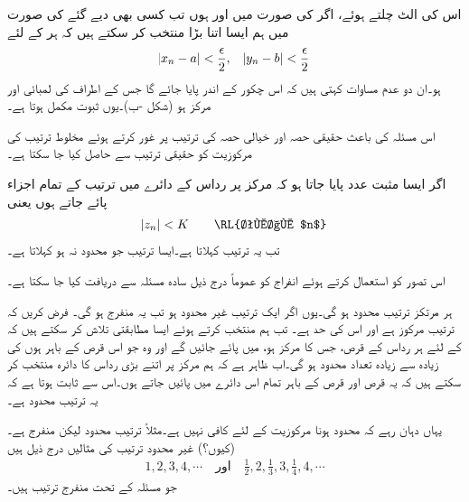 اس کی الٹ چلتے ہوئے، اگر  کی صورت میں  اور  ہوں  تب کسی بھی دیے گئے  کی صورت میں ہم ایسا  اتنا بڑا منتخب کر سکتے ہیں کہ ہر  کے لئے 
\begin{align*}
\abs{x_n-a}<\frac{\epsilon}{2},\quad \abs{y_n-b}<\frac{\epsilon}{2}
\end{align*}
ہو۔ان دو عدم مساوات کہتی ہیں کہ  اس چکور کے اندر پایا جائے گا جس کے اطراف کی لمبائی  اور مرکز  ہو (شکل -ب)۔یوں ثبوت مکمل ہوتا ہے۔

اس مسئلہ کی باعث حقیقی حصہ اور خیالی حصہ کی ترتیب پر غور کرتے ہوئے مخلوط ترتیب کی مرکوزیت کو حقیقی ترتیب سے حاصل کیا جا سکتا ہے۔

اگر ایسا مثبت عدد  پایا جاتا ہو کہ مرکز پر رداس  کے دائرے میں ترتیب  کے تمام اجزاء  پائے جاتے ہوں  یعنی
\begin{align*}
\abs{z_n}<K \quad \quad \text{\RL{تمام $n$}}
\end{align*}
تب یہ ترتیب  کہلاتا  ہے۔ایسا ترتیب جو محدود نہ ہو  کہلاتا ہے۔

اس تصور کو استعمال کرتے ہوئے انفراج  کو عموماً درج ذیل سادہ مسئلہ  سے دریافت کیا جا سکتا ہے۔

ہر مرتکز ترتیب محدود ہو گی۔یوں اگر ایک ترتیب غیر محدود ہو تب یہ منفرج ہو گی۔
فرض کریں کہ ترتیب  مرکوز ہے اور اس کی حد  ہے۔ تب ہم  منتخب کرتے ہوئے ایسا مطابقتی  تلاش کر سکتے ہیں کہ   کے لئے ہر  رداس  کے قرص، جس کا مرکز  ہو، میں پائے جائیں گے اور وہ   جو اس قرص کے باہر ہوں کی زیادہ سے زیادہ تعداد محدود ہو گی۔اب ظاہر ہے کہ ہم مرکز پر اتنے بڑی  رداس  کا دائرہ منتخب کر سکتے ہیں کہ یہ قرص اور قرص کے باہر تمام  اس دائرے میں پائیں جاتے ہوں۔اس سے ثابت ہوتا ہے کہ یہ ترتیب محدود ہے۔

یہاں دہان رہے کہ محدود ہونا مرکوزیت کے لئے کافی نہیں ہے۔مثلاً ترتیب  محدود  لیکن منفرج ہے۔ (کیوں؟) غیر محدود ترتیب کی مثالیں درج ذیل ہیں
\begin{align*}
1,2,3,4,\cdots\quad \text{اور}\quad \frac{1}{2},2,\frac{1}{3},3,\frac{1}{4},4,\cdots
\end{align*} 
جو مسئلہ  کے تحت منفرج ترتیب ہیں۔

